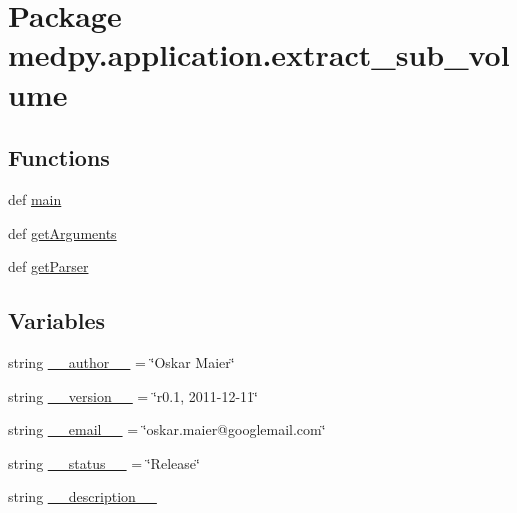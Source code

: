 \hypertarget{namespacemedpy_1_1application_1_1extract__sub__volume}{
\section{Package medpy.application.extract\_\-sub\_\-volume}
\label{namespacemedpy_1_1application_1_1extract__sub__volume}
}
\subsection*{Functions}
\begin{DoxyCompactItemize}
\item 
def \hyperlink{namespacemedpy_1_1application_1_1extract__sub__volume_afef0015f55614714ba01d113a08bffde}{main}
\item 
def \hyperlink{namespacemedpy_1_1application_1_1extract__sub__volume_a005705be5e9a7ddf4307d83eebe567bb}{getArguments}
\item 
def \hyperlink{namespacemedpy_1_1application_1_1extract__sub__volume_abe3dcd211268ee154226d4b1e106a47c}{getParser}
\end{DoxyCompactItemize}
\subsection*{Variables}
\begin{DoxyCompactItemize}
\item 
string \hyperlink{namespacemedpy_1_1application_1_1extract__sub__volume_aadbf37c426d7b308cb5bed5ae7bbae11}{\_\-\_\-author\_\-\_\-} = \char`\"{}Oskar Maier\char`\"{}
\item 
string \hyperlink{namespacemedpy_1_1application_1_1extract__sub__volume_acf7abd549e8d142f01136d98f5258945}{\_\-\_\-version\_\-\_\-} = \char`\"{}r0.1, 2011-\/12-\/11\char`\"{}
\item 
string \hyperlink{namespacemedpy_1_1application_1_1extract__sub__volume_a289485556bf881a1fadcccfb5a338866}{\_\-\_\-email\_\-\_\-} = \char`\"{}oskar.maier@googlemail.com\char`\"{}
\item 
string \hyperlink{namespacemedpy_1_1application_1_1extract__sub__volume_aa0bc50790ac213e2eef547d1efc1edf2}{\_\-\_\-status\_\-\_\-} = \char`\"{}Release\char`\"{}
\item 
string \hyperlink{namespacemedpy_1_1application_1_1extract__sub__volume_a0446e20791fb37d8718ca9467da0803b}{\_\-\_\-description\_\-\_\-}
\end{DoxyCompactItemize}


